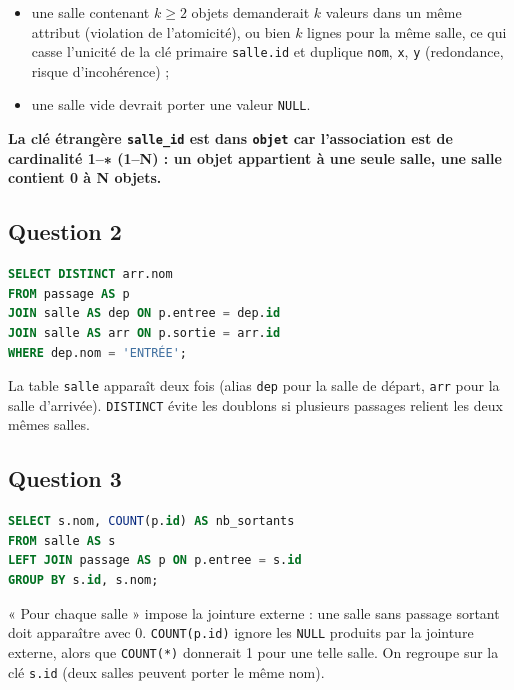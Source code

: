 \documentclass[11pt,a4paper]{article}
\providecommand{\tightlist}{\setlength{\itemsep}{0pt}\setlength{\parskip}{0pt}}
\begin{document}
\begin{itemize}
\tightlist
\item
  une salle contenant \(k \ge 2\) objets demanderait \(k\) valeurs dans un même attribut (violation de l'atomicité), ou bien \(k\) lignes pour la même salle, ce qui casse l'unicité de la clé primaire \texttt{salle.id} et duplique \texttt{nom}, \texttt{x}, \texttt{y} (redondance, risque d'incohérence) ;
\item
  une salle vide devrait porter une valeur \texttt{NULL}.
\end{itemize}

\textbf{La clé étrangère \texttt{salle\_id} est dans \texttt{objet} car l'association est de cardinalité 1--∗ (1--N) : un objet appartient à une seule salle, une salle contient 0 à N objets.}

\hypertarget{question-2}{%
\subsection{Question 2}\label{question-2}}

\begin{lstlisting}[language=SQL]
SELECT DISTINCT arr.nom
FROM passage AS p
JOIN salle AS dep ON p.entree = dep.id
JOIN salle AS arr ON p.sortie = arr.id
WHERE dep.nom = 'ENTRÉE';
\end{lstlisting}

La table \texttt{salle} apparaît deux fois (alias \texttt{dep} pour la salle de départ, \texttt{arr} pour la salle d'arrivée). \texttt{DISTINCT} évite les doublons si plusieurs passages relient les deux mêmes salles.

\hypertarget{question-3}{%
\subsection{Question 3}\label{question-3}}

\begin{lstlisting}[language=SQL]
SELECT s.nom, COUNT(p.id) AS nb_sortants
FROM salle AS s
LEFT JOIN passage AS p ON p.entree = s.id
GROUP BY s.id, s.nom;
\end{lstlisting}

« Pour chaque salle » impose la jointure externe : une salle sans passage sortant doit apparaître avec 0. \texttt{COUNT(p.id)} ignore les \texttt{NULL} produits par la jointure externe, alors que \texttt{COUNT(*)} donnerait 1 pour une telle salle. On regroupe sur la clé \texttt{s.id} (deux salles peuvent porter le même nom).
\end{document}
